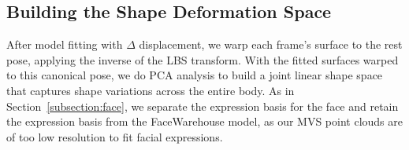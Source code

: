 
\subsection{Building the Shape Deformation Space}

After model fitting with $\Delta$ displacement, we warp each frame's surface to the rest pose, applying the inverse of the LBS transform. With the fitted surfaces warped to this canonical pose, we do PCA analysis to build a joint linear shape space that captures shape variations across the entire body. As in Section~\ref{subsection:face}, we separate the expression basis for the face and retain the expression basis from the FaceWarehouse model, as our MVS point clouds are of too low resolution to fit facial expressions.

